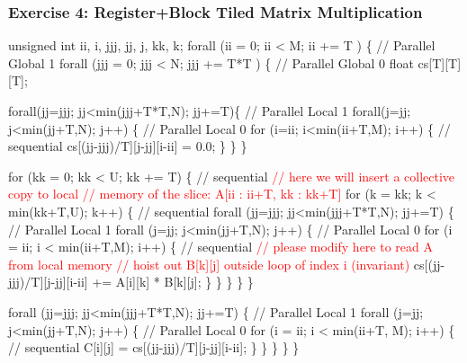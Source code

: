 \documentclass{beamer}
\newcommand{\red}[1]{\textcolor{Red}{{#1}}}
\renewcommand{\emph}[1]{\textcolor{CosGreen}{ #1}}
\newcommand{\emp}[1]{\textcolor{DikuRed}{ #1}}
\begin{document}
\begin{frame}[fragile,t]
  \frametitle{Exercise 4: Register+Block Tiled Matrix Multiplication}

\begin{colorcode}[fontsize=\tiny]
unsigned int ii, i, jjj, jj, j, kk, k;
\emp{forall (ii = 0; ii < M; ii += T ) \{           // Parallel Global 1}
  \emp{forall (jjj = 0; jjj < N; jjj += T*T ) \{    // Parallel Global 0}
    float cs[T][T][T];

    \emph{forall(jj=jjj; jj<min(jjj+T*T,N); jj+=T)\{ // Parallel Local 1}
      \emph{forall(j=jj; j<min(jj+T,N); j++) \{      // Parallel Local 0}
        for (i=ii; i<min(ii+T,M); i++) \{      // sequential
          cs[(jj-jjj)/T][j-jj][i-ii] = 0.0;
    \} \} \}

    for (kk = 0; kk < U; kk += T) \{                 // sequential
      \red{// here we will insert a collective copy to local}
      \red{// memory of the slice: A[ii : ii+T, kk : kk+T]}
      for (k = kk; k < min(kk+T,U); k++) \{          // sequential
        \emph{forall (jj=jjj; jj<min(jjj+T*T,N); jj+=T) \{ // Parallel Local 1}
          \emph{forall (j=jj; j<min(jj+T,N); j++) \{       // Parallel Local 0}
            for (i = ii; i < min(ii+T,M); i++) \{    // sequential
              \red{// please modify here to read A from local memory}
              \red{// hoist out B[k][j] outside loop of index i (invariant)}
              cs[(jj-jjj)/T][j-jj][i-ii] += A[i][k] * B[k][j];
    \} \} \} \} \}

    \emp{forall (jj=jjj; jj<min(jjj+T*T,N); jj+=T) \{     // Parallel Local 1}
      \emp{forall (j=jj; j<min(jj+T,N); j++) \{           // Parallel Local 0}
        for (i = ii; i < min(ii+T, M); i++) \{       // sequential
          C[i][j] = cs[(jj-jjj)/T][j-jj][i-ii];
    \} \} \}
\} \}
\end{colorcode}
\end{frame}
\end{document}

